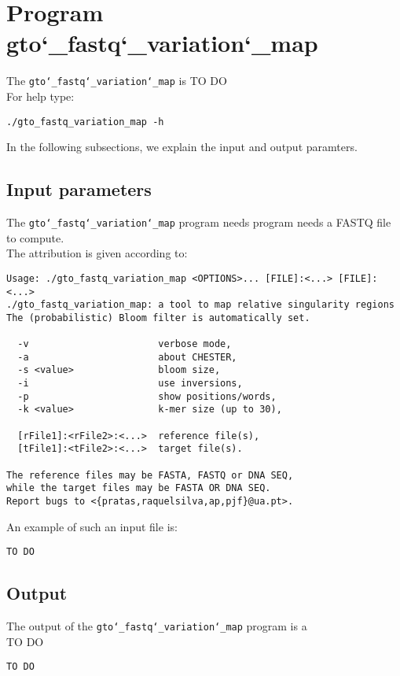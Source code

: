 \section{Program gto\char`_fastq\char`_variation\char`_map}
The \texttt{gto\char`_fastq\char`_variation\char`_map} is TO DO\\
For help type:
\begin{lstlisting}
./gto_fastq_variation_map -h
\end{lstlisting}
In the following subsections, we explain the input and output paramters.

\subsection*{Input parameters}

The \texttt{gto\char`_fastq\char`_variation\char`_map} program needs program needs a FASTQ file to compute.\\
The attribution is given according to:
\begin{lstlisting}
Usage: ./gto_fastq_variation_map <OPTIONS>... [FILE]:<...> [FILE]:<...>
./gto_fastq_variation_map: a tool to map relative singularity regions  
The (probabilistic) Bloom filter is automatically set.   
                                                         
  -v                       verbose mode,                 
  -a                       about CHESTER,                
  -s <value>               bloom size,                   
  -i                       use inversions,               
  -p                       show positions/words,         
  -k <value>               k-mer size (up to 30),        
                                                         
  [rFile1]:<rFile2>:<...>  reference file(s),            
  [tFile1]:<tFile2>:<...>  target file(s).               
                                                         
The reference files may be FASTA, FASTQ or DNA SEQ,      
while the target files may be FASTA OR DNA SEQ.          
Report bugs to <{pratas,raquelsilva,ap,pjf}@ua.pt>.
\end{lstlisting}
An example of such an input file is:
\begin{lstlisting}
TO DO
\end{lstlisting}

\subsection*{Output}
The output of the \texttt{gto\char`_fastq\char`_variation\char`_map} program is a \\
TO DO
\begin{lstlisting}
TO DO
\end{lstlisting}
